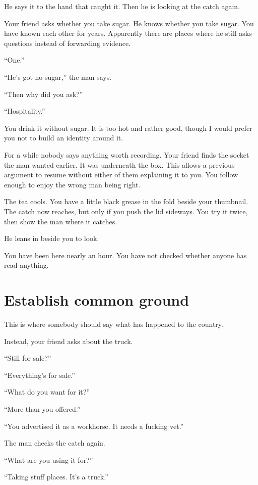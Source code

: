 \documentclass[11pt,oneside]{book}
\begin{document}
He says it to the hand that caught it. Then he is looking at the catch again.

Your friend asks whether you take sugar. He knows whether you take sugar. You have known each other for years. Apparently there are places where he still asks questions instead of forwarding evidence.

``One.''

``He's got no sugar,'' the man says.

``Then why did you ask?''

``Hospitality.''

You drink it without sugar. It is too hot and rather good, though I would prefer you not to build an identity around it.

For a while nobody says anything worth recording. Your friend finds the socket the man wanted earlier. It was underneath the box. This allows a previous argument to resume without either of them explaining it to you. You follow enough to enjoy the wrong man being right.

The tea cools. You have a little black grease in the fold beside your thumbnail. The catch now reaches, but only if you push the lid sideways. You try it twice, then show the man where it catches.

He leans in beside you to look.

You have been here nearly an hour. You have not checked whether anyone has read anything.

\section*{Establish common ground}

This is where somebody should say what has happened to the country.

Instead, your friend asks about the truck.

``Still for sale?''

``Everything's for sale.''

``What do you want for it?''

``More than you offered.''

``You advertised it as a workhorse. It needs a fucking vet.''

The man checks the catch again.

``What are you using it for?''

``Taking stuff places. It's a truck.''
\end{document}
